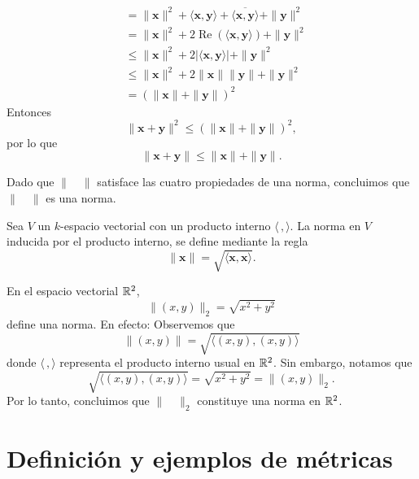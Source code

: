 \begin{example}
\begin{enumerate}[label=\roman*.]
\begin{align*}
            & = \| \mathbf{x} \|^2 + \langle \mathbf{x}, \mathbf{y} \rangle + \overline{\langle \mathbf{x}, \mathbf{y} \rangle} + \| \mathbf{y} \|^2 \\
            & = \| \mathbf{x} \|^2 + 2 \operatorname{Re} \left( \langle \mathbf{x}, \mathbf{y} \rangle \right) + \| \mathbf{y} \|^2 \\
            & \leq \| \mathbf{x} \|^2 + 2 \left| \langle \mathbf{x}, \mathbf{y} \rangle \right| + \| \mathbf{y} \|^2 \\
            & \leq \| \mathbf{x} \|^2 + 2 \| \mathbf{x} \| \| \mathbf{y} \| + \| \mathbf{y} \|^2 \\
            & = \left( \| \mathbf{x} \| + \| \mathbf{y} \| \right)^2
        \end{align*}
        Entonces
        $$\| \mathbf{x} + \mathbf{y} \|^2 \leq \left( \| \mathbf{x} \| + \| \mathbf{y} \| \right)^2,$$
        por lo que
        $$\| \mathbf{x} + \mathbf{y} \| \leq \| \mathbf{x} \| + \| \mathbf{y} \|.$$
    \end{enumerate}
    Dado que $\| \quad \|$ satisface las cuatro propiedades de una norma, concluimos que $\| \quad \|$ es una norma.
\end{example}

\newpage

\begin{definition}
    Sea $V$ un $k$-espacio vectorial con un producto interno $\langle \, , \rangle$. La norma en $V$ inducida por el producto interno, se define mediante la regla
    $$\| \mathbf{x} \| = \sqrt{\langle \mathbf{x}, \mathbf{x} \rangle}.$$
\end{definition}

\begin{example}
    En el espacio vectorial $\RR[2]$,
    $$\| (x, y) \|_2 = \sqrt{x^2 + y^2}$$
    define una norma. En efecto: Observemos que
    $$\| (x, y) \| = \sqrt{\langle (x, y), (x, y) \rangle}$$
    donde $\langle \, , \rangle$ representa el producto interno usual en $\RR[2]$. Sin embargo, notamos que
    $$\sqrt{\langle (x, y), (x, y) \rangle} = \sqrt{x^2 + y^2} = \| (x, y) \|_2.$$
    Por lo tanto, concluimos que $\| \quad \|_2$ constituye una norma en $\RR[2]$.
\end{example}

\section{Definición y ejemplos de métricas}

